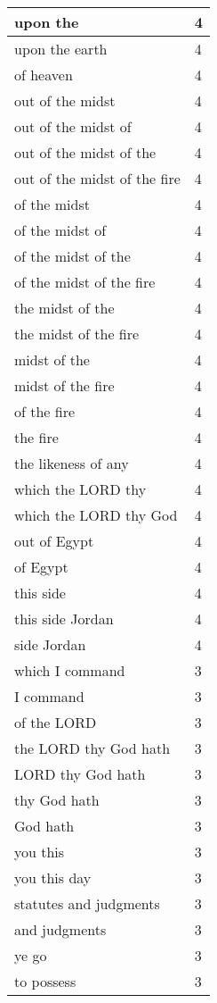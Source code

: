 \begin{center}
\begin{longtable}{|p{3.0in}|p{0.5in}|}
upon the & 4\\ \hline 
upon the earth & 4\\ \hline 
of heaven & 4\\ \hline 
out of the midst & 4\\ \hline 
out of the midst of & 4\\ \hline 
out of the midst of the & 4\\ \hline 
out of the midst of the fire & 4\\ \hline 
of the midst & 4\\ \hline 
of the midst of & 4\\ \hline 
of the midst of the & 4\\ \hline 
of the midst of the fire & 4\\ \hline 
the midst of the & 4\\ \hline 
the midst of the fire & 4\\ \hline 
midst of the & 4\\ \hline 
midst of the fire & 4\\ \hline 
of the fire & 4\\ \hline 
the fire & 4\\ \hline 
the likeness of any & 4\\ \hline 
which the LORD thy & 4\\ \hline 
which the LORD thy God & 4\\ \hline 
out of Egypt & 4\\ \hline 
of Egypt & 4\\ \hline 
this side & 4\\ \hline 
this side Jordan & 4\\ \hline 
side Jordan & 4\\ \hline 
which I command & 3\\ \hline 
I command & 3\\ \hline 
of the LORD & 3\\ \hline 
the LORD thy God hath & 3\\ \hline 
LORD thy God hath & 3\\ \hline 
thy God hath & 3\\ \hline 
God hath & 3\\ \hline 
you this & 3\\ \hline 
you this day & 3\\ \hline 
statutes and judgments & 3\\ \hline 
and judgments & 3\\ \hline 
ye go & 3\\ \hline 
to possess & 3\\ \hline 

\end{longtable}
\end{center}
